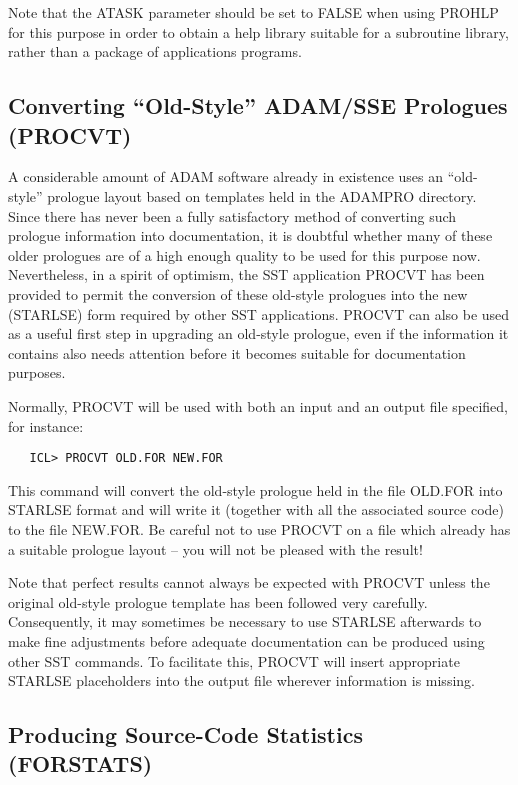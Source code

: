 \documentclass[twoside,11pt]{article}
\renewcommand{\_}{\texttt{\symbol{95}}}
\begin{document}
Note that the ATASK parameter should be set to FALSE when using PROHLP for
this purpose in order to obtain a help library suitable for a subroutine
library, rather than a package of applications programs.


\subsection{Converting ``Old-Style'' ADAM/SSE Prologues (PROCVT)}
\label{sect:procvt}

A considerable amount of ADAM software already in existence uses an
``old-style'' prologue layout based on templates held in the ADAM\_PRO
directory.
Since there has never been a fully satisfactory method of converting such
prologue information into documentation, it is doubtful whether many of
these older prologues are of a high enough quality to be used for this
purpose now.
Nevertheless, in a spirit of optimism, the SST application PROCVT has been
provided to permit the conversion of these old-style prologues into the new
(STARLSE) form required by other SST applications.
PROCVT can also be used as a useful first step in upgrading an old-style
prologue, even if the information it contains also needs attention before it
becomes suitable for documentation purposes.

Normally, PROCVT will be used with both an input and an output file
specified, for instance:

\begin{verbatim}
   ICL> PROCVT OLD.FOR NEW.FOR
\end{verbatim}

This command will convert the old-style prologue held in the file OLD.FOR
into STARLSE format and will write it (together with all the associated
source code) to the file NEW.FOR.
Be careful not to use PROCVT on a file which already has a suitable prologue
layout -- you will not be pleased with the result!

Note that perfect results cannot always be expected with PROCVT unless the
original old-style prologue template has been followed very carefully.
Consequently, it may sometimes be necessary to use STARLSE afterwards to
make fine adjustments before adequate documentation can be produced using
other SST commands.
To facilitate this, PROCVT will insert appropriate STARLSE placeholders into
the output file wherever information is missing.


\subsection{Producing Source-Code Statistics (FORSTATS)}
\end{document}
